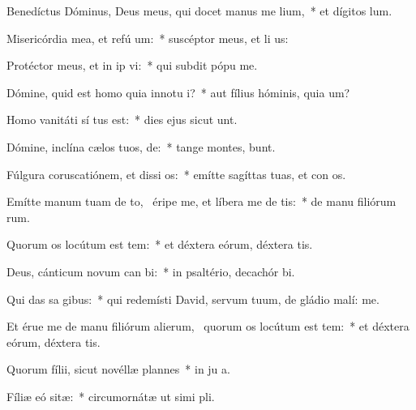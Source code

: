 \item Benedíctus Dóminus, Deus meus, qui docet manus me  lium,~* et dígitos   lum.
\item Misericórdia mea, et refú um:~* suscéptor meus, et li us:
\item Protéctor meus, et in ip vi:~* qui subdit pópu   me.
\item Dómine, quid est homo quia innotu i?~* aut fílius hóminis, quia  um?
\item Homo vanitáti sí tus est:~* dies ejus sicut  unt.
\item Dómine, inclína cælos tuos,  de:~* tange montes,  bunt.
\item Fúlgura coruscatiónem, et dissi os:~* emítte sagíttas tuas, et con os.
\item Emítte manum tuam de to,~\pscross{} éripe me, et líbera me de  tis:~* de manu filiórum rum.
\item Quorum os locútum est tem:~* et déxtera eórum, déxtera tis.
\item Deus, cánticum novum can bi:~* in psaltério, decachór  bi.
\item Qui das sa gibus:~* qui redemísti David, servum tuum, de gládio malí:  me.
\item Et érue me de manu filiórum alierum,~\pscross{} quorum os locútum est tem:~* et déxtera eórum, déxtera tis.
\item Quorum fílii, sicut novéllæ plannes~* in ju a.
\item Fíliæ eó sitæ:~* circumornátæ ut simi pli.
